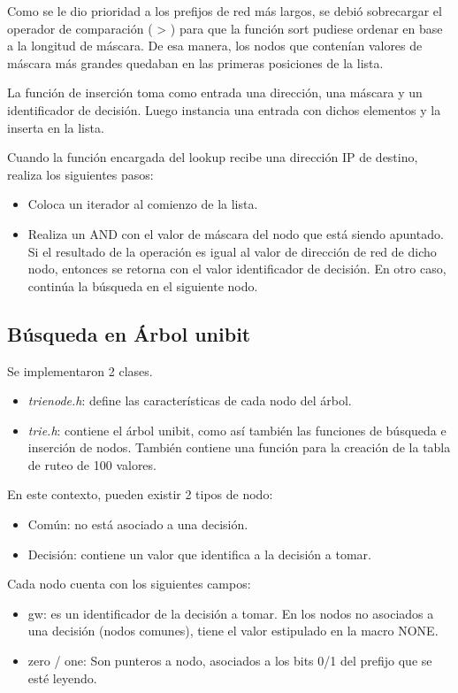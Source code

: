 Como se le dio prioridad a los prefijos de red más largos, se debió sobrecargar el operador de comparación ( > ) para que la función sort pudiese ordenar en base a la longitud de máscara. De esa manera, los nodos que contenían valores de máscara más grandes quedaban en las primeras posiciones de la lista.

La función de inserción toma como entrada una dirección, una máscara y un identificador de decisión. Luego instancia una entrada con dichos elementos y la inserta en la lista.

Cuando la función encargada del lookup recibe una dirección IP de destino, realiza los siguientes pasos:

\begin{itemize}
	\item Coloca un iterador al comienzo de la lista.
	\item Realiza un AND con el valor de máscara del nodo que está siendo apuntado. Si el resultado de la operación es igual al valor de dirección de red de dicho nodo, entonces se retorna con el valor identificador de decisión. En otro caso, continúa la búsqueda en el siguiente nodo.
\end{itemize}

\subsection {Búsqueda en Árbol unibit}

Se implementaron 2 clases. 

\begin{itemize}
	\item \textit{trienode.h}: define las características de cada nodo del árbol.
	\item \textit{trie.h}: contiene el árbol unibit, como así también las funciones de búsqueda e inserción de nodos. También contiene una función para la creación de la tabla de ruteo de 100 valores.
\end{itemize}


En este contexto, pueden existir 2 tipos de nodo:

\begin{itemize}
	\item Común: no está asociado a una decisión.
	\item Decisión: contiene un valor que identifica a la decisión a tomar. 
\end{itemize}

Cada nodo cuenta con los siguientes campos:
\begin{itemize}
	\item gw: es un identificador de la decisión a tomar. En los nodos no asociados a una decisión (nodos comunes), tiene el valor estipulado en la macro NONE.
    \item zero / one: Son punteros a nodo, asociados a los bits 0/1 del prefijo que se esté leyendo.

\end{itemize}

